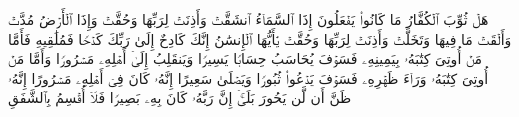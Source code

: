 \stopbuffer
\startbuffer[\q:83:36]
هَلۡ ثُوِّبَ ٱلۡكُفَّارُ مَا كَانُوا۟ یَفۡعَلُونَ%
\stopbuffer
\startbuffer[\q:84:1]
إِذَا ٱلسَّمَاۤءُ ٱنشَقَّتۡ%
\stopbuffer
\startbuffer[\q:84:2]
وَأَذِنَتۡ لِرَبِّهَا وَحُقَّتۡ%
\stopbuffer
\startbuffer[\q:84:3]
وَإِذَا ٱلۡأَرۡضُ مُدَّتۡ%
\stopbuffer
\startbuffer[\q:84:4]
وَأَلۡقَتۡ مَا فِیهَا وَتَخَلَّتۡ%
\stopbuffer
\startbuffer[\q:84:5]
وَأَذِنَتۡ لِرَبِّهَا وَحُقَّتۡ%
\stopbuffer
\startbuffer[\q:84:6]
یَٰۤأَیُّهَا ٱلۡإِنسَٰنُ إِنَّكَ كَادِحٌ إِلَىٰ رَبِّكَ كَدۡحࣰا فَمُلَٰقِیهِ%
\stopbuffer
\startbuffer[\q:84:7]
فَأَمَّا مَنۡ أُوتِیَ كِتَٰبَهُۥ بِیَمِینِهِۦ%
\stopbuffer
\startbuffer[\q:84:8]
فَسَوۡفَ یُحَاسَبُ حِسَابࣰا یَسِیرࣰا%
\stopbuffer
\startbuffer[\q:84:9]
وَیَنقَلِبُ إِلَىٰۤ أَهۡلِهِۦ مَسۡرُورࣰا%
\stopbuffer
\startbuffer[\q:84:10]
وَأَمَّا مَنۡ أُوتِیَ كِتَٰبَهُۥ وَرَاۤءَ ظَهۡرِهِۦ%
\stopbuffer
\startbuffer[\q:84:11]
فَسَوۡفَ یَدۡعُوا۟ ثُبُورࣰا%
\stopbuffer
\startbuffer[\q:84:12]
وَیَصۡلَىٰ سَعِیرًا%
\stopbuffer
\startbuffer[\q:84:13]
إِنَّهُۥ كَانَ فِیۤ أَهۡلِهِۦ مَسۡرُورًا%
\stopbuffer
\startbuffer[\q:84:14]
إِنَّهُۥ ظَنَّ أَن لَّن یَحُورَ%
\stopbuffer
\startbuffer[\q:84:15]
بَلَىٰۤۚ إِنَّ رَبَّهُۥ كَانَ بِهِۦ بَصِیرࣰا%
\stopbuffer
\startbuffer[\q:84:16]
فَلَاۤ أُقۡسِمُ بِٱلشَّفَقِ%
\stopbuffer
